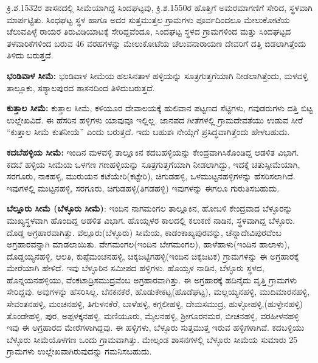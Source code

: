 ಕ್ರಿ.ಶ.1532ರ ಶಾಸನದಲ್ಲಿ ಸೀಮೆಯಾಗಿದ್ದ ಸಿಂದಘಟ್ಟವು, ಕ್ರಿ.ಶ.1550ರ ಹೊತ್ತಿಗೆ ಅಮರಮಾಗಣಿಗೆ ಸೇರಿದ, ಸ್ಥಳವಾಗಿ ಮಾರ್ಪಟ್ಟಿತು. ಸಿಂಧಘಟ್ಟ ಸ್ಥಳ ಹಾಗೂ ಅದರ ಸುತ್ತಮುತ್ತಲ ಗ್ರಾಮಗಳು ಪೂರ್ವದಿಂದಲೂ ಮೇಲುಕೋಟೆಯ ಚೆಲುವಪಿಳ್ಳೆ ರಾಯರ ತಿರುವಿಡಿಯಾಟಕ್ಕೆ ಸೇರಿದ್ದವೆಂದೂ, ಸಿಂದಘಟ್ಟ ಸ್ಥಳದ ಗ್ರಾಮಗಳಿಂದ ಮತ್ತು ಸಿಂದಘಟ್ಟದ ತಳವಾರಿಕೆ\-ಗಳಿಂದ ಬರುವ 46 ವರಹಗಳನ್ನು ಮೇಲುಕೋಟೆಯ ಚೆಲುವನಾರಾಯಣ ದೇವರಿಗೆ ದತ್ತಿ ಬಿಡಲಾಗಿತ್ತೆಂದು ತಿಳಿದು ಬರುತ್ತದೆ.

\textbf{ಭಂಡಿವಾಳ ಸೀಮೆ:} ಭಂಡಿವಾಳ ಸೀಮೆಯ ಹಲಸಿನತಾಳ ಹಳ್ಳಿಯನ್ನು ಸೂತ್ರಗುತ್ತಗೆಯಾಗಿ ನೀಡಲಾಗಿತ್ತೆಂದು, ಮಳವಳ್ಳಿ ತಾಲ್ಲೂಕು, ಸಶ್ಯಾಲಪುರದ ಶಾಸನದಿಂದ ತಿಳಿದುಬರುತ್ತದೆ.

\textbf{ಕುತ್ತಾಲ ಸೀಮೆ:} ಕುತ್ತಾಲ ಸೀಮೆ, ಕಳಿಯೂರ ದೇವಾಲಯಕ್ಕೆ ಹುಲಿವಾನ ಪಟ್ಟಣದ ಸೆಟ್ಟಿಗಳು, ಗವುಡರುಗಳು ದತ್ತಿ ಬಿಟ್ಟ ಉಲ್ಲೇಖವಿದೆ. ಈ ಹೆಸರಿನ ಹಳ್ಳಿಗಳು ಯಾವುವೂ ಇಲ್ಲಿಲ್ಲ. ಜಾನಪದ ಗೀತೆಗಳಲ್ಲಿ ಗ್ರಾಮದೇವತೆಯು ಉಡುವ ಸೀರೆ “ಕುತ್ತಾಲ ಸೀಮೆ ಕುತನೀಯೆ” ಎಂದು ಬರುತ್ತದೆ. ಇದು ಬಹುಶಃ ನೇಯ್ಗೆಗೆ ಪ್ರಸಿದ್ಧವಾಗಿತ್ತೆಂದು ಹೇಳಬಹುದು.

\textbf{ಕದಬೆಹಳ್ಳಿಯ ಸೀಮೆ:} ಇಂದಿನ ಮಳವಳ್ಳಿ ತಾಲ್ಲೂಕಿನ ಕದಬಹಳ್ಳಿಯನ್ನು ಕೇಂದ್ರವಾಗಿಸಿಕೊಂಡಿದ್ದ ಆಡಳಿತ ವಿಭಾಗ. ಕದಬೆ ಹಳ್ಳಿಯ ಸೀಮೆಯ ಒಳಗಣ ಗಣಹಳ್ಳಿಯನ್ನು ಸೂತ್ರಗುತ್ತಗೆಯಾಗಿ ನೀಡಲಾಗಿದ್ದು, ಇದಕ್ಕೆ ಚತುಸ್ಸೀಮೆಯಾಗಿ, ಸರಗೂರು, ನಾಕಹಳ್ಳಿ, ಮುರುಯನ ಕಟೆಯೇರಿ(ಕಟ್ಟೇರಿ), ಚಿಗುಡಹಳ್ಳಿ, ಒಳಮುಟ್ಟನಹಳ್ಳಿಗಳನ್ನು ಹೆಸರಿಸಲಾಗಿದೆ. ಇವುಗಳಲ್ಲಿ ಮುಟ್ಟನಹಳ್ಳಿ, ಸರಗೂರು, ಚಿಗುಡಹಳ್ಳಿ(ತಿಗಡಹಳ್ಳಿ) ಇವುಗಳನ್ನು ಈಗಲೂ ಗುರುತಿಸಬಹುದು.

\textbf{ಬೆಲ್ಲೂರು ಸೀಮೆ (ಬೆಳ್ಳೂರು ಸೀಮೆ)}: ಇಂದಿನ ನಾಗಮಂಗಲ ತಾಲ್ಲೂಕಿನ, ಹೋಬಳಿ ಕೇಂದ್ರವಾದ ಬೆಳ್ಳೂರನ್ನು ಮುಖ್ಯಸ್ಥಳವಾಗಿ ಹೊಂದಿದ್ದ ಆಡಳಿತ ವಿಭಾಗ. ಹೊಯ್ಸಳರ ಕಾಲದಲ್ಲಿ ಕಲುಕಣಿ ನಾಡಿನ, ಸ್ಥಳವಾಗಿದ್ದ ಬೆಳ್ಳೂರು. ದೊಡ್ಡ ಅಗ್ರಹಾರವಾಗಿತ್ತು. ವೆಲ್ಲೂರು(ಬೆಳ್ಳೂರು) ಸೀಮೆಯ, ಕಾಡಂಕಾಖ್ಯಪುರವನ್ನು, ಚೆನ್ನಾದೇವಿಪುರವೆಂಬ ಅಗ್ರಹಾರವನ್ನಾಗಿ ಮಾಡಲಾಯಿತು. ವೇಗಮಂಗಲ(ಇಂದಿನ ಬೇಗಮಂಗಲ), ಹಾಳೆಹಾಳು(ಇಂದಿನ ಹಾಲಾಳು), ದೊಡ್ಡಯ್ಯನಹಳ್ಳಿ, ಆಲತಿ, ಕುಪ್ಪೆಮಂಚನಹಳ್ಳಿ, ಚಿಕ್ಕಜಟ್ಟಿಗಹಳ್ಳಿ(ಇಂದಿನ ಚಿಕ್ಕಜಟಕ) ಗ್ರಾಮಗಳನ್ನು ಈ ಅಗ್ರಹಾರಕ್ಕೆ ಮೇರೆಯಾಗಿ ಹೇಳಿದೆ. ಇವು ಬೆಳ್ಳೂರಿನ ಸಮೀಪದ ಹಳ್ಳಿಗಳು. ಹೊಯ್ಸಳ ನಾಡಿನ, ಬೆಳ್ಳೂರು ಸ್ಥಳದ, ಹೊನ್ನಯನಹಳ್ಳಿಯು, ವೆಂಕಟಾದ್ರಿಸಮುದ್ರವೆಂಬ ಅಗ್ರಹಾರವಾಗಿತ್ತು. ಈ ಅಗ್ರಹಾರಕ್ಕೆ ಹದಿನೈದು ವೃತ್ತಿ ಗ್ರಾಮಗಳು ಸೇರಿದ್ದವು. ಅವುಗಳನ್ನು ಹೆಸರಿಸಿಲ್ಲ. ಬೆನಕನಕೆರೆ, ಹೊಡುಕೇಕಟ್ಟ(ಹೊಡೆಘಟ್ಟ), ಮಲ್ಲಯ್ಯನಹಳ್ಳಿ, ಮುದಿಮಾರನಹಳ್ಳಿ, ಸೇವಂತನಹಳ್ಳಿ, ಮಂಚನಹಳ್ಳಿ, ತಿಗುಳನಕೆರೆ, ಬಾಳೆಹಳ್ಳಿ, ಕಗ್ಗಲೀಹಳ್ಳಿ, ದೇಮಸಮುದ್ರ, ಹುಳ್ಳೋಹಳ್ಳಿ,(ಹುಳ್ಳೇನಹಳ್ಳಿ) ತೊಂಡೇಹಳ್ಳಿ, ಪುರ, ಅಪ್ಪಳಕ್ಕನಹಳ್ಳಿ, ಮಣಿಯೂರು, ಮೈಲನಹಳ್ಳಿ, ಶ‍್ರೀಗೂರನಮಠ, ಬೀಚನಹಳ್ಳಿ, ವರಹೀಳನಹಳ್ಳಿ ಇವು ಈ ಅಗ್ರಹಾರದ ಮೇರೆಗಳಾಗಿದ್ದವು. ಈ ಹಳ್ಳಿಗಳು, ಬೆಳ್ಳೂರು ಸುತ್ತಮುತ್ತ ಇರುವ ಹಳ್ಳಿಗಳಾಗಿವೆ. ಕದಬಳ್ಳಿಯು ಬೆಳ್ಳೂರು ಸೀಮೆಯೊಳಗಣ ಒಂದು ಗ್ರಾಮವಾಗಿತ್ತು. ಮೇಲ್ಕಂಡ ಶಾಸನಗಳಲ್ಲಿ ಬೆಳ್ಳೂರು ಸೀಮೆಯ ಸುಮಾರು 25 ಗ್ರಾಮಗಳು ಉಲ್ಲೇಖವಾಗಿರುವುದನ್ನು ಗಮನಿಸಬಹುದು.

